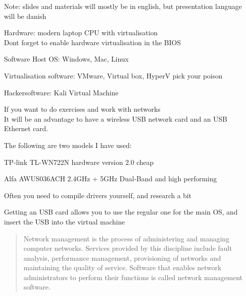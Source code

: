 \documentclass[Screen16to9,17pt]{foils}
\begin{document}
Note: slides and materials will mostly be in english, but presentation language will be danish





\begin{list2}
\item Hardware: modern laptop CPU with virtualisation\\
Dont forget to enable hardware virtualisation in the BIOS
\item Software Host OS: Windows, Mac, Linux
\item Virtualisation software: VMware, Virtual box, HyperV pick your poison
\item Hackersoftware: Kali Virtual Machine 
\end{list2}




If you want to do exercises and work with networks \\
It will be an advantage to have a wireless USB network card and an USB Ethernet card.

The following are two models I have used:
\begin{list2}
\item TP-link TL-WN722N hardware version 2.0 cheap
\item Alfa AWUS036ACH 2.4GHz + 5GHz Dual-Band and high performing
\item Often you need to compile drivers yourself, and research a bit
\end{list2}

Getting an USB card allows you to use the regular one for the main OS, and insert the USB into the virtual machine




\begin{quote}
Network management is the process of administering and managing computer networks. Services provided by this discipline include fault analysis, performance management, provisioning of networks and maintaining the quality of service. Software that enables network administrators to perform their functions is called network management software.\\
\end{quote}
\end{document}
